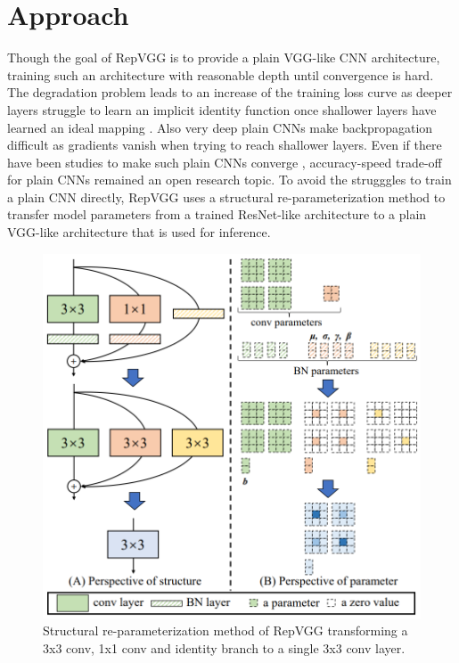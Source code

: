 \section{Approach}

Though the goal of RepVGG is to provide a plain VGG-like CNN architecture, training such an architecture with reasonable depth until convergence is hard. The degradation problem leads to an increase of the training loss curve as deeper layers struggle to learn an implicit identity function once shallower layers have learned an ideal mapping \cite{KaimingHe.2015}. Also very deep plain CNNs make backpropagation difficult as gradients vanish when trying to reach shallower layers. Even if there have been studies to make such plain CNNs converge \cite{LechaoXiao.2018, OyebadeKOyedotun.2020}, accuracy-speed trade-off for plain CNNs remained an open research topic. To avoid the strugggles to train a plain CNN directly, RepVGG uses a structural re-parameterization method to transfer model parameters from a trained ResNet-like architecture to a plain VGG-like architecture that is used for inference. 

\begin{figure}[t]
	\begin{center}
		\includegraphics[width=0.8\linewidth]{images/re-parameterization.PNG}
	\end{center}
	\caption{Structural re-parameterization method of RepVGG transforming a 3x3 conv, 1x1 conv and identity branch to a single 3x3 conv layer.}
	\label{fig:reparameterization}
\end{figure}

